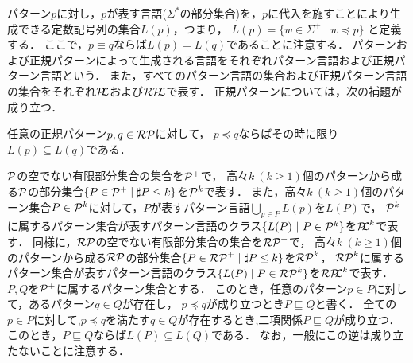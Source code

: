 パターン$p$に対し，$p$が表す言語($\Sigma^{*}$の部分集合)を，$p$に代入を施すことにより生成できる定数記号列の集合$L(p)$，つまり，
$L(p)=\{w\in \Sigma^{+} \mid w \preceq p\}$
と定義する．
ここで，$p \equiv q$ならば$L(p)=L(q)$であることに注意する．
パターンおよび正規パターンによって生成される言語をそれぞれパターン言語および正規パターン言語という．
また，すべてのパターン言語の集合および正規パターン言語の集合をそれぞれ$\mathcal{P\!\!L}$および$\mathcal{RP\!\!L}$で表す．
正規パターンについては，次の補題が成り立つ．
\begin{lem}\label{補題1}
  任意の正規パターン$p,q \in \mathcal{RP}$に対して，
$p \preceq q$ならばその時に限り$L(p) \subseteq L(q)$である．
\end{lem}
$\mathcal{P}$の空でない有限部分集合の集合を$\mathcal{P}^{+}$で，
高々$k~(k\geq 1)$個のパターンから成る$\mathcal{P}$の部分集合$\{P\in \mathcal{P}^{+} \mid \sharp P \leq k\}$を$\mathcal{P}^{k}$で表す．
また，高々$k~(k\geq 1)$個のパターン集合$P\in \mathcal{P}^{k}$に対して，$P$が表すパターン言語$\bigcup_{p\in P}L(p)$を$L(P)$で，
$\mathcal{P}^{k}$に属するパターン集合が表すパターン言語のクラス$\{ L(P) \ | \ P \in \mathcal{P}^{k} \}$を$\mathcal{P\!\!L}^{k}$で表す．
同様に，$\mathcal{RP}$の空でない有限部分集合の集合を$\mathcal{RP}^{+}$で，
高々$k~(k\geq 1)$個のパターンから成る$\mathcal{RP}$の部分集合$\{P \in \mathcal{RP}^{+} \mid \sharp P \leq k\}$を$\mathcal{RP}^{k}$，
$\mathcal{RP}^{k}$に属するパターン集合が表すパターン言語のクラス$\{L(P) \mid P\in \mathcal{RP}^{k}\}$を$\mathcal{RP\!\!L}^{k}$で表す． 
$P, Q$を$\mathcal{P}^{+}$に属するパターン集合とする．
このとき，任意のパターン$p \in P$に対して，あるパターン$q\in Q$が存在し，
$p\preceq q$が成り立つとき$P \sqsubseteq Q$と書く．
全ての$p \in P$に対して,$p \preceq q$を満たす$q \in Q$が存在するとき,二項関係$P \sqsubseteq Q$が成り立つ．
%
このとき，$P \sqsubseteq Q$ならば$L(P) \subseteq L(Q)$である．
なお，一般にこの逆は成り立たないことに注意する．